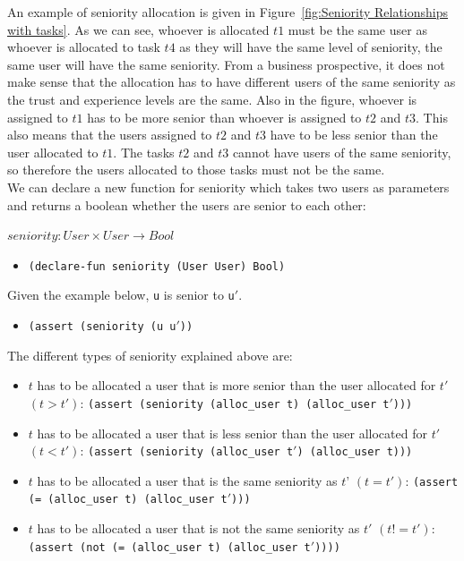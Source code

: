\documentclass[a4paper]{report}
\begin{document}
An example of seniority allocation is given in Figure~\ref{fig:Seniority Relationships with tasks}. As we can see, whoever is allocated $t1$ must be the same user as whoever is allocated to task $t4$ as they will have the same level of seniority, the same user will have the same seniority. From a business prospective, it does not make sense that the allocation has to have different users of the same seniority as the trust and experience levels are the same. Also in the figure, whoever is assigned to $t1$ has to be more senior than whoever is assigned to $t2$ and $t3$. This also means that the users assigned to $t2$ and $t3$ have to be less senior than the user allocated to $t1$. The tasks $t2$ and $t3$ cannot have users of the same seniority, so therefore the users allocated to those tasks must not be the same.\\

We can declare a new function for seniority which takes two users as parameters and returns a boolean whether the users are senior to each other:
\begin{center}
$seniority : User \times User \rightarrow Bool$
\end{center}
\begin{itemize}
\item \texttt{(declare-fun seniority (User User) Bool)}
\end{itemize}
Given the example below, \texttt{u} is senior to \texttt{u\ensuremath{'}}.
\begin{itemize}
\item \texttt{(assert (seniority (u u\ensuremath{'}))}
\end{itemize}
The different types of seniority explained above are:
\begin{itemize}
\item $t$ has to be allocated a user that is more senior than the user allocated for $t\ensuremath{'}$ $(t > t\ensuremath{'})$: \texttt{(assert (seniority (alloc\_user t) (alloc\_user t\ensuremath{'})))}
\item $t$ has to be allocated a user that is less senior than the user allocated for $t\ensuremath{'}$ $(t < t\ensuremath{'})$: \texttt{(assert (seniority (alloc\_user t\ensuremath{'}) (alloc\_user t)))}
\item $t$ has to be allocated a user that is the same seniority as $t’$ $(t = t\ensuremath{'})$: \texttt{(assert (= (alloc\_user t) (alloc\_user t\ensuremath{'})))}
\item $t$ has to be allocated a user that is not the same seniority as $t\ensuremath{'}$ $(t != t\ensuremath{'})$: \texttt{(assert (not (= (alloc\_user t) (alloc\_user t\ensuremath{'}))))}
\end{itemize}
\end{document}
